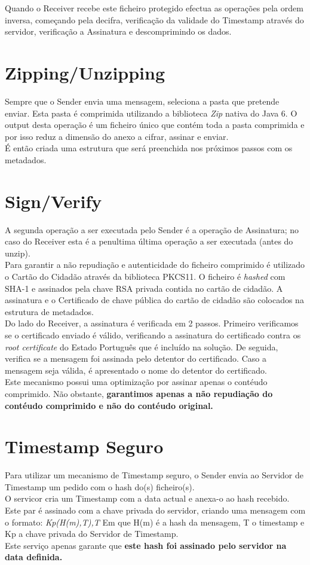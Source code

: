 Quando o Receiver recebe este ficheiro protegido efectua as operações pela ordem inversa, começando pela decifra, verificação da validade do Timestamp através do servidor, verificação a Assinatura e descomprimindo os dados.

\section{Zipping/Unzipping}
Sempre que o Sender envia uma mensagem, seleciona a pasta que pretende enviar. Esta pasta é comprimida utilizando a biblioteca \textit{Zip} nativa do Java 6. O output desta operação é um ficheiro único que contém toda a pasta comprimida e por isso reduz a dimensão do anexo a cifrar, assinar e enviar.\\
É então criada uma estrutura que será preenchida nos próximos passos com os metadados.
\section{Sign/Verify}
A segunda operação a ser executada pelo Sender é a operação de Assinatura; no caso do Receiver esta é a penultima última operação a ser executada (antes do unzip). \\
Para garantir a não repudiação e autenticidade do ficheiro comprimido é utilizado o Cartão do Cidadão através da biblioteca PKCS11. O ficheiro é \textit{hashed} com SHA-1 e assinados pela chave RSA privada contida no cartão de cidadão. A assinatura e o Certificado de chave pública do cartão de cidadão são colocados na estrutura de metadados. \\

Do lado do Receiver, a assinatura é verificada em 2 passos. Primeiro verificamos se o certificado enviado é válido, verificando a assinatura do certificado contra os \textit{root certificate} do Estado Português que é incluído na solução. De seguida, verifica se a mensagem foi assinada pelo detentor do certificado. Caso a mensagem seja válida, é apresentado o nome do detentor do certificado.\\
Este mecanismo possui uma optimização por assinar apenas o contéudo comprimido. Não obstante,\textbf{ garantimos apenas a não repudiação do contéudo comprimido e não do contéudo original.} 

\section{Timestamp Seguro}
\label{section:timestamp}
Para utilizar um mecanismo de Timestamp seguro, o Sender envia ao Servidor de Timestamp um pedido com o hash do(s) ficheiro(s).\\
 O servicor cria um Timestamp com a data actual e anexa-o ao hash recebido. Este par é assinado com a chave privada do servidor, criando uma mensagem com o formato: \textit{Kp(H(m),T),T}
Em que H(m) é a hash da mensagem, T o timestamp e Kp a chave privada do Servidor de Timestamp. \\
Este serviço apenas garante que \textbf{este hash foi assinado pelo servidor na data definida.} \\

